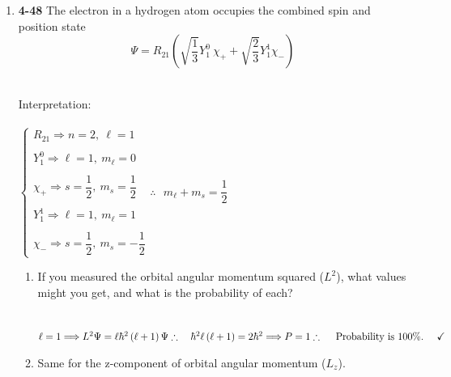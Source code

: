 \documentclass[fleqn]{article}
\begin{document}
\begin{enumerate}
\begin{enumerate}
    \end{enumerate}

    \pagebreak

    \item \textbf{4-48} The electron in a hydrogen atom occupies the combined spin and position state
    $$
      \Psi=R_{21} \left(
        \sqrt{\dfrac{1}{3}} Y_1^0 ~ \chi_+ +\sqrt{\dfrac{2}{3}} Y_1^1 \chi_-
      \right)
    $$

    \textcolor{hwColor}{
      \\
      Interpretation:
      \\
      \\
      $
        \begin{cases}
          R_{21} \Longrightarrow n=2, ~ \ell=1
          \\
          \\
          Y_1^0 \Longrightarrow \ell=1, ~ m_{\ell}=0
          \\
          \\
          \chi_+ \Longrightarrow s=\dfrac{1}{2}, ~ m_s=\dfrac{1}{2}
          \\
          \\
          Y_1^1 \Longrightarrow \ell=1, ~ m_{\ell}=1
          \\
          \\
          \chi_- \Longrightarrow s=\dfrac{1}{2}, ~ m_s=-\dfrac{1}{2}
        \end{cases}
        \therefore ~~~ m_{\ell}+m_s=\dfrac{1}{2}
      $
    }

    \begin{enumerate}
      \item If you measured the orbital angular momentum squared ($L^2$), what values might you get,
      and what is the probability of each?

        \textcolor{hwColor}{
          \\
          $
            \ell=1 \Longrightarrow L^2 \Psi=\ell \hbar^2 \left(\ell+1\right) \Psi
            \\
            \\
            \therefore ~~~ \hbar^2 \ell \left(\ell+1\right)=2 \hbar^2 \Longrightarrow P=1
            \\
            \\
            \therefore ~~~~ \text{Probability is $100\%$}. ~~~~ \checkmark
          $
          \\
        }

      \item Same for the z-component of orbital angular momentum ($L_z$).


\end{enumerate}
\end{enumerate}
\end{document}
